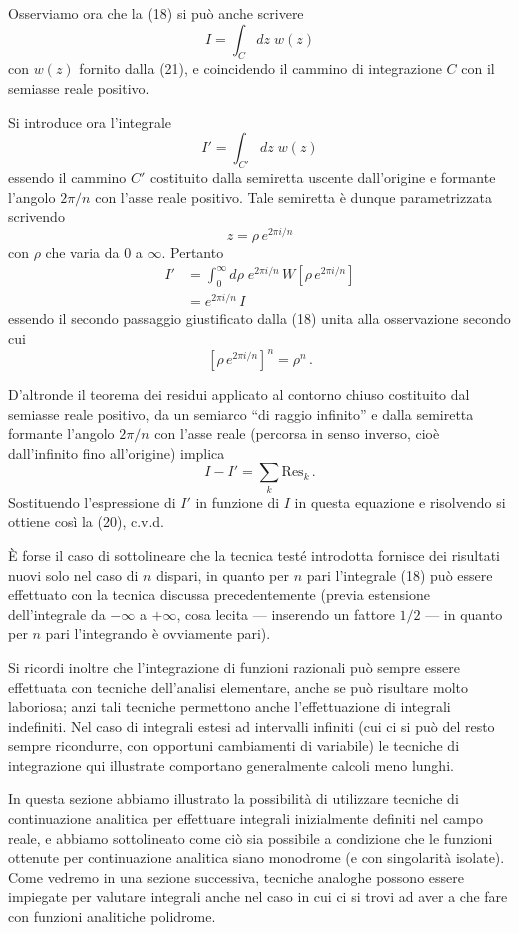 \documentclass[11pt, a4paper]{book}
\numberwithin{equation}{section}
\begin{document}
Osserviamo ora che la (18) si può anche scrivere
\[
I = \int_C dz\; w(z)
\]
con $w(z)$ fornito dalla (21), e coincidendo il cammino di integrazione $C$ con il semiasse reale positivo.

Si introduce ora l'integrale
\[
I' = \int_{C'} dz\; w(z)
\]
essendo il cammino $C'$ costituito dalla semiretta uscente dall'origine e formante l'angolo $2\pi/n$ con l'asse reale positivo. Tale semiretta è dunque parametrizzata scrivendo
\[
z = \rho\,e^{2\pi i/n}
\]
con $\rho$ che varia da $0$ a $\infty$. Pertanto
\begin{align*}
I' &= \int_0^{\infty} d\rho\; e^{2\pi i/n}\, W\!\left[\rho\,e^{2\pi i/n}\right] \\
&= e^{2\pi i/n}\, I
\end{align*}
essendo il secondo passaggio giustificato dalla (18) unita alla osservazione secondo cui
\[
\left[\rho\,e^{2\pi i/n}\right]^n = \rho^n\,.
\]

D'altronde il teorema dei residui applicato al contorno chiuso costituito dal semiasse reale positivo, da un semiarco ``di raggio infinito'' e dalla semiretta formante l'angolo $2\pi/n$ con l'asse reale (percorsa in senso inverso, cioè dall'infinito fino all'origine) implica
\[
I - I' = \sum_k \mathrm{Res}_k\,.
\]
Sostituendo l'espressione di $I'$ in funzione di $I$ in questa equazione e risolvendo si ottiene così la (20), c.v.d.

È forse il caso di sottolineare che la tecnica testé introdotta fornisce dei risultati nuovi solo nel caso di $n$ dispari, in quanto per $n$ pari l'integrale (18) può essere effettuato con la tecnica discussa precedentemente (previa estensione dell'integrale da $-\infty$ a $+\infty$, cosa lecita — inserendo un fattore $1/2$ — in quanto per $n$ pari l'integrando è ovviamente pari).

Si ricordi inoltre che l'integrazione di funzioni razionali può sempre essere effettuata con tecniche dell'analisi elementare, anche se può risultare molto laboriosa; anzi tali tecniche permettono anche l'effettuazione di integrali indefiniti. Nel caso di integrali estesi ad intervalli infiniti (cui ci si può del resto sempre ricondurre, con opportuni cambiamenti di variabile) le tecniche di integrazione qui illustrate comportano generalmente calcoli meno lunghi.

In questa sezione abbiamo illustrato la possibilità di utilizzare%
tecniche di continuazione analitica per effettuare integrali inizialmente definiti nel campo reale, e abbiamo sottolineato come ciò sia possibile a condizione che le funzioni ottenute per continuazione analitica siano monodrome (e con singolarità isolate). Come vedremo in una sezione successiva, tecniche analoghe possono essere impiegate per valutare integrali anche nel caso in cui ci si trovi ad aver a che fare con funzioni analitiche polidrome.
\end{document}
